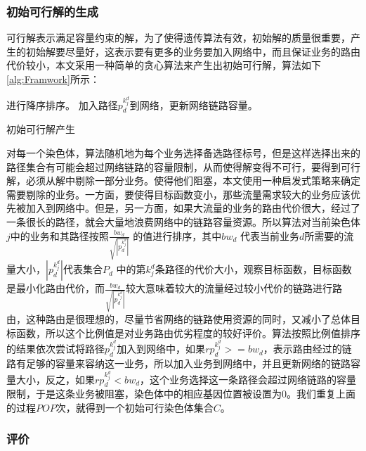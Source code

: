 \subsubsection{初始可行解的生成}
可行解表示满足容量约束的解，为了使得遗传算法有效，初始解的质量很重要，产生的初始解要尽量好，这表示要有更多的业务要加入网络中，而且保证业务的路由代价较小，本文采用一种简单的贪心算法来产生出初始可行解，算法如下\ref{alg:Framwork}所示：
\begin{algorithm}[htb]
\begin{algorithmic}[1]
\EndFor
{}进行降序排序。
\State 加入路径$p^{k^d_j}_d$到网络，更新网络链路容量。
\Else
{}
\EndIf
\EndFor
\EndFor
\end{algorithmic}
\caption{初始可行解产生}
\label{alg:Framwork}
\end{algorithm}

对每一个染色体，算法随机地为每个业务选择备选路径标号，但是这样选择出来的路径集合有可能会超过网络链路的容量限制，从而使得解变得不可行，要得到可行解，必须从解中剔除一部分业务。使得他们阻塞，本文使用一种启发式策略来确定需要剔除的业务。一方面，要使得目标函数变小，那些流量需求较大的业务应该优先被加入到网络中。但是，另一方面，如果大流量的业务的路由代价很大，经过了一条很长的路径，就会大量地浪费网络中的链路容量资源。所以算法对当前染色体$j$中的业务和其路径按照$\frac{bw_d}{\sqrt{|p^{k^d_j}_d|}}$ 的值进行排序，其中${bw_d}$ 代表当前业务$d$所需要的流量大小，$|p^{k^d_j}_d|$代表集合$P_d$ 中的第${k^d_j}$条路径的代价大小，观察目标函数，目标函数是最小化路由代价，而$\frac{bw_d}{\sqrt{|p^{k^d_j}_d|}}$较大意味着较大的流量经过较小代价的链路进行路由，这种路由是很理想的，尽量节省网络的链路使用资源的同时，又减小了总体目标函数，所以这个比例值是对业务路由优劣程度的较好评价。算法按照比例值排序的结果依次尝试将路径$p^{k^d_j}_d$加入到网络中，如果$rp^{k^d_j}_d>=bw_d$，表示路由经过的链路有足够的容量来容纳这一业务，所以加入业务到网络中，并且更新网络的链路容量大小，反之，如果$rp^{k^d_j}_d<bw_d$，这个业务选择这一条路径会超过网络链路的容量限制，于是这条业务被阻塞，染色体中的相应基因位置被设置为0。我们重复上面的过程$POP$次，就得到一个初始可行染色体集合$C$。
\subsubsection{评价}

